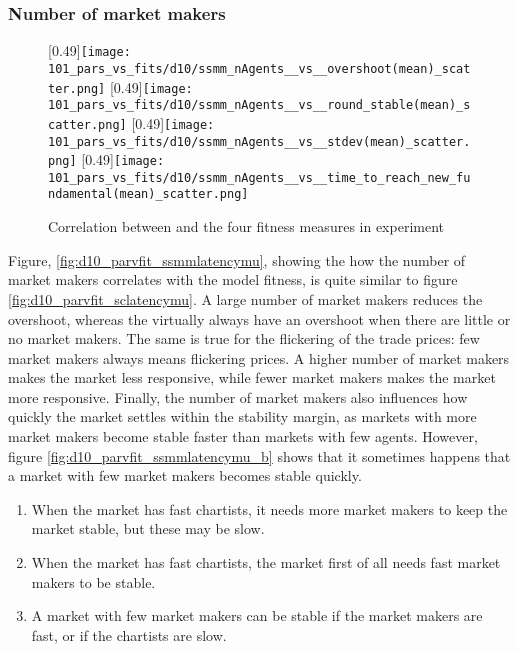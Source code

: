 \subsubsection*{Number of market makers}
\begin{figure}
	\centering
	[0.49\linewidth]{\texttt{[image: 101\_pars\_vs\_fits/d10/ssmm\_nAgents\_\_vs\_\_overshoot(mean)\_scatter.png]}}
	[0.49\linewidth]{\texttt{[image: 101\_pars\_vs\_fits/d10/ssmm\_nAgents\_\_vs\_\_round\_stable(mean)\_scatter.png]}}
	[0.49\linewidth]{\texttt{[image: 101\_pars\_vs\_fits/d10/ssmm\_nAgents\_\_vs\_\_stdev(mean)\_scatter.png]}}
	[0.49\linewidth]{\texttt{[image: 101\_pars\_vs\_fits/d10/ssmm\_nAgents\_\_vs\_\_time\_to\_reach\_new\_fundamental(mean)\_scatter.png]}}
	\caption{Correlation between \ssmmnAgents and the four fitness measures in experiment \dten}
	\label{fig:d10_parvfit_ssmmnAgents}
\end{figure}
Figure, \ref{fig:d10_parvfit_ssmmlatencymu}, showing the how the number of market makers correlates with the model fitness, is quite similar to figure \ref{fig:d10_parvfit_sclatencymu}. A large number of market makers reduces the overshoot, whereas the virtually always have an overshoot when there are little or no market makers. The same is true for the flickering of the trade prices: few market makers always means flickering prices. A higher number of market makers makes the market less responsive, while fewer market makers makes the market more responsive. Finally, the number of market makers also influences how quickly the market settles within the stability margin, as markets with more market makers become stable faster than markets with few agents. However, figure \ref{fig:d10_parvfit_ssmmlatencymu_b} shows that it sometimes happens that a market with few market makers becomes stable quickly.

\begin{enumerate}
\item When the market has fast chartists, it needs more market makers to keep the market stable, but these may be slow.
\item When the market has fast chartists, the market first of all needs fast market makers to be stable.
\item A market with few market makers can be stable if the market makers are fast, or if the chartists are slow.
\end{enumerate}

